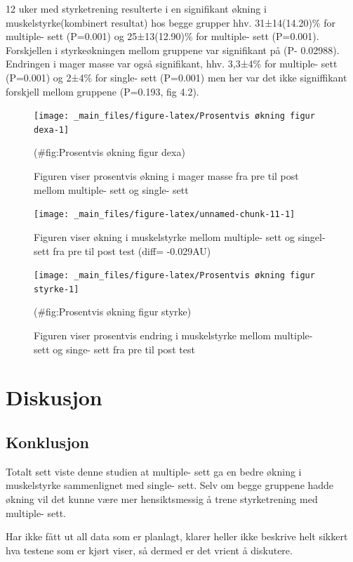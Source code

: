 \documentclass[
]{book}
\begin{document}
12 uker med styrketrening resulterte i en signifikant økning i muskelstyrke(kombinert resultat) hos begge grupper hhv. 31±14(14.20)\% for multiple- sett (P=0.001) og 25±13(12.90)\% for multiple- sett (P=0.001). Forskjellen i styrkeøkningen mellom gruppene var signifikant på (P- 0.02988). Endringen i mager masse var også signifikant, hhv. 3,3±4\% for multiple- sett (P=0.001) og 2±4\% for single- sett (P=0.001) men her var det ikke signiffikant forskjell mellom gruppene (P=0.193, fig 4.2).

\begin{figure}
\texttt{[image: \_main\_files/figure-latex/Prosentvis økning figur dexa-1]} \caption{Figuren viser prosentvis økning i mager masse fra pre til post mellom multiple- sett og single- sett}(\#fig:Prosentvis økning figur dexa)
\end{figure}

\begin{figure}
\texttt{[image: \_main\_files/figure-latex/unnamed-chunk-11-1]} \caption{Figuren viser økning i muskelstyrke mellom multiple- sett og singel- sett fra pre til post test (diff= -0.029AU)}\label{fig:unnamed-chunk-11}
\end{figure}

\begin{figure}
\texttt{[image: \_main\_files/figure-latex/Prosentvis økning figur styrke-1]} \caption{Figuren viser prosentvis endring i muskelstyrke mellom multiple- sett og singe- sett fra pre til post test}(\#fig:Prosentvis økning figur styrke)
\end{figure}

\hypertarget{diskusjon-2}{%
\section{Diskusjon}\label{diskusjon-2}}

\hypertarget{konklusjon}{%
\subsection{Konklusjon}\label{konklusjon}}

Totalt sett viste denne studien at multiple- sett ga en bedre økning i muskelstyrke sammenlignet med single- sett. Selv om begge gruppene hadde økning vil det kunne være mer hensiktsmessig å trene styrketrening med multiple- sett.

Har ikke fått ut all data som er planlagt, klarer heller ikke beskrive helt sikkert hva testene som er kjørt viser, så dermed er det vrient å diskutere.

  
\end{document}
